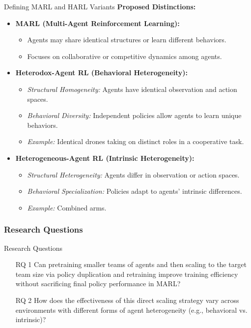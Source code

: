 
\begin{frame}{Defining MARL and HARL Variants}
    \textbf{Proposed Distinctions:}
    \begin{itemize}
        \item \textbf{MARL (Multi-Agent Reinforcement Learning):}
        \begin{itemize}
            \item Agents may share identical structures or learn different behaviors.
            \item Focuses on collaborative or competitive dynamics among agents.
        \end{itemize}
        \item \textbf{Heterodox-Agent RL (Behavioral Heterogeneity):}
        \begin{itemize}
            \item \emph{Structural Homogeneity:} Agents have identical observation and action spaces.
            \item \emph{Behavioral Diversity:} Independent policies allow agents to learn unique behaviors.
            \item \textit{Example:} Identical drones taking on distinct roles in a cooperative task.
        \end{itemize}
        \item \textbf{Heterogeneous-Agent RL (Intrinsic Heterogeneity):}
        \begin{itemize}
            \item \emph{Structural Heterogeneity:} Agents differ in observation or action spaces.
            \item \emph{Behavioral Specialization:} Policies adapt to agents' intrinsic differences.
            \item \textit{Example:} Combined arms.
        \end{itemize}
    \end{itemize}
\end{frame}

\subsubsection{Research Questions}

\begin{frame}{Research Questions}
    \begin{enumerate}
        \item[RQ 1] {
            Can pretraining smaller teams of agents and then scaling to the target 
            team size via policy duplication and retraining improve training efficiency 
            without sacrificing final policy performance in MARL?}
        \item[RQ 2] {
            How does the effectiveness of this direct scaling strategy vary across 
            environments with different forms of agent heterogeneity 
            (e.g., behavioral vs. intrinsic)?}
    \end{enumerate}
\end{frame}

